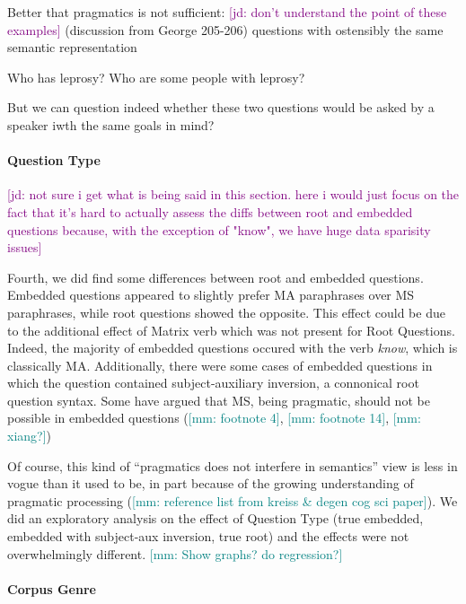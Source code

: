 \documentclass[12pt,letterpaper,table,svgnames,dvipsnames]{article}
\newcommand{\jd}[1]{\textcolor{Purple}{[jd: #1]}}
\newcommand{\mm}[1]{\textcolor{teal}{[mm: #1]}}
\begin{document}
Better that pragmatics is not sufficient: \jd{don't understand the point of these examples}
(discussion from George 205-206)
questions with ostensibly the same semantic representation 
\begin{exe}
\ex {}
    \begin{xlist}
        \ex Who has leprosy?
        \ex Who are some people with leprosy?
    \end{xlist}
\end{exe}
But we can question indeed whether these two questions would be asked by a speaker iwth the same goals in mind?


\paragraph{Question Type}

\jd{not sure i get what is being said in this section. here i would just focus on the fact that it's hard to actually assess the diffs between root and embedded questions because, with the exception of "know", we have huge data sparisity issues}

Fourth, we did find some differences between root and embedded questions. Embedded questions appeared to slightly prefer MA paraphrases over MS paraphrases, while root questions showed the opposite. This effect could be due to the additional effect of Matrix verb which was not present for Root Questions. Indeed, the majority of embedded questions occured with the verb \emph{know}, which is classically MA. Additionally, there were some cases of embedded questions in which the question contained subject-auxiliary inversion, a connonical root question syntax. Some have argued that MS, being pragmatic, should not be possible in embedded questions (\cite{karttunen1977}\mm{footnote 4}, \cite{groenstok1984}\mm{footnote 14}, \mm{xiang?})

Of course, this kind of ``pragmatics does not interfere in semantics'' view is less in vogue than it used to be, in part because of the growing understanding of pragmatic processing (\mm{reference list from kreiss \& degen cog sci paper}). We did an exploratory analysis on the effect of Question Type (true embedded, embedded with subject-aux inversion, true root) and the effects were not overwhelmingly different. \mm{Show graphs? do regression?} 


\paragraph{Corpus Genre}
\end{document}
